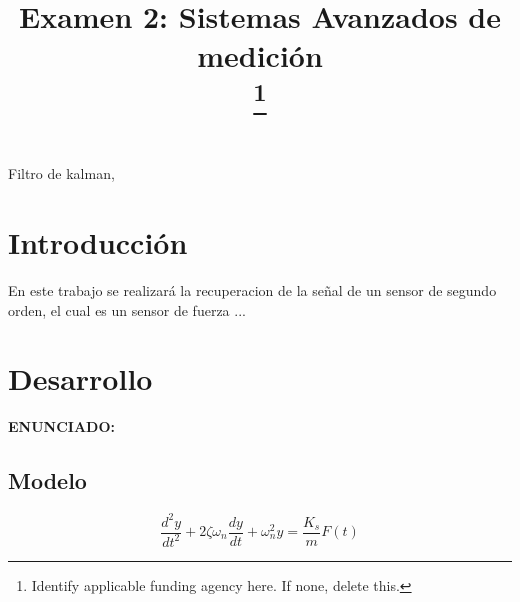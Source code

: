 \documentclass[conference]{IEEEtran}
\begin{document}
\title{Examen 2: Sistemas Avanzados de medici\'on\\
	\thanks{Identify applicable funding agency here. If none, delete this.}
}

\author{
	\and

}

\maketitle

\begin{IEEEkeywords}
	Filtro de kalman,
\end{IEEEkeywords}

\section{Introducción}

En este trabajo se realizar\'a la recuperacion de la se\~nal de un sensor de segundo orden, el cual es un sensor de fuerza ...

\section{Desarrollo}


\textbf{ENUNCIADO:}



\subsection{Modelo}

\begin{equation}
	\frac{d^2y}{dt^2} + 2\zeta\omega_n \frac{dy}{dt} + \omega_n^2 y = \frac{K_s}{m} F(t)
\end{equation}
\end{document}
